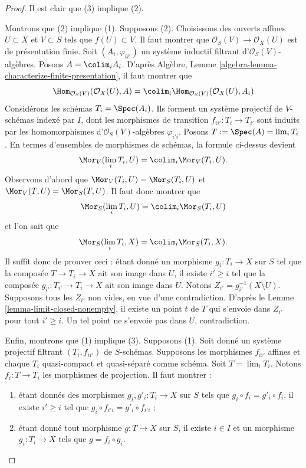\begin{proof}
Il est clair que (3) implique (2).

\medskip\noindent
Montrons que (2) implique (1). Supposons (2). Choisissons des ouverts affines
$U \subset X$ et $V \subset S$ tels que $f(U) \subset V$. Il faut montrer
que $\mathcal{O}_S(V) \to \mathcal{O}_X(U)$ est de présentation finie.
Soit $(A_i, \varphi_{ii'})$ un système inductif filtrant
d'$\mathcal{O}_S(V)$-algèbres. Posons $A = \colim_i A_i$. D'après Algèbre,
Lemme \ref{algebra-lemma-characterize-finite-presentation}, il faut montrer
que
$$
\Hom_{\mathcal{O}_S(V)}(\mathcal{O}_X(U), A) =
\colim_i \Hom_{\mathcal{O}_S(V)}(\mathcal{O}_X(U), A_i)
$$
Considérons les schémas $T_i = \Spec(A_i)$. Ils forment un système projectif
de $V$-schémas indexé par $I$, dont les morphismes de transition
$f_{ii'} : T_i \to T_{i'}$ sont induits par les homomorphismes
d'$\mathcal{O}_S(V)$-algèbres $\varphi_{i'i}$. Posons
$T := \Spec(A) = \lim_i T_i$. En termes d'ensembles de morphismes de
schémas, la formule ci-dessus devient
$$
\Mor_V(\lim_i T_i, U) =
\colim_i \Mor_V(T_i, U).
$$
Observons d'abord que
$\Mor_V(T_i, U) = \Mor_S(T_i, U)$
et
$\Mor_V(T, U) = \Mor_S(T, U)$.
Il faut donc montrer que
$$
\Mor_S(\lim_i T_i, U) =
\colim_i \Mor_S(T_i, U)
$$
et l'on sait que
$$
\Mor_S(\lim_i T_i, X) =
\colim_i \Mor_S(T_i, X).
$$
Il suffit donc de prouver ceci : étant donné un morphisme
$g_i : T_i \to X$ sur $S$ tel que la composée $T \to T_i \to X$ ait son
image dans $U$, il existe $i' \geq i$ tel que la composée
$g_{i'} : T_{i'} \to T_i \to X$ ait son image dans $U$. Notons
$Z_{i'} = g_{i'}^{-1}(X \setminus U)$. Supposons tous les $Z_{i'}$ non vides,
en vue d'une contradiction. D'après le
Lemme \ref{lemma-limit-closed-nonempty}, il existe un point $t$ de $T$ qui
s'envoie dans $Z_{i'}$ pour tout $i' \geq i$. Un tel point ne s'envoie pas
dans $U$, contradiction.

\medskip\noindent
Enfin, montrons que (1) implique (3). Supposons (1). Soit donné un système
projectif filtrant $(T_i, f_{ii'})$ de $S$-schémas. Supposons les morphismes
$f_{ii'}$ affines et chaque $T_i$ quasi-compact et quasi-séparé comme schéma.
Soit $T = \lim_i T_i$. Notons $f_i : T \to T_i$ les morphismes de
projection. Il faut montrer :
\begin{enumerate}
\item[(a)] étant donnés des morphismes $g_i, g'_i : T_i \to X$ sur $S$ tels
que $g_i \circ f_i = g'_i \circ f_i$, il existe $i' \geq i$ tel que
$g_i \circ f_{i'i} = g'_i \circ f_{i'i}$ ;
\item[(b)] étant donné tout morphisme $g : T \to X$ sur $S$, il existe
$i \in I$ et un morphisme $g_i : T_i \to X$ tels que
$g = f_i \circ g_i$.
\end{enumerate}


\end{proof}
